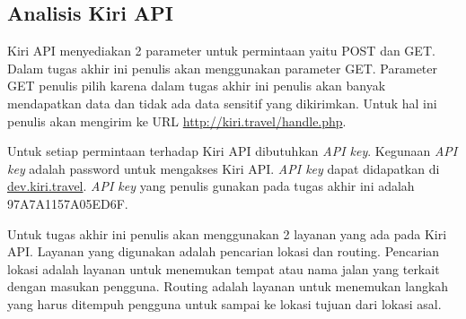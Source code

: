 \subsection{Analisis Kiri API}
\label{lab:Analisis Kiri API}
\hspace{0.5cm} Kiri API menyediakan 2 parameter untuk permintaan yaitu POST dan GET. Dalam tugas akhir ini penulis akan menggunakan parameter GET. Parameter GET penulis pilih karena dalam tugas akhir ini penulis akan banyak mendapatkan data dan tidak ada data sensitif yang dikirimkan. Untuk hal ini penulis akan mengirim ke URL \url{http://kiri.travel/handle.php}.

\hspace{0.5cm} Untuk setiap permintaan terhadap Kiri API dibutuhkan \textit{API key}. Kegunaan \textit{API key} adalah password untuk mengakses Kiri API. \textit{API key} dapat didapatkan di \url{dev.kiri.travel}. \textit{API key} yang penulis gunakan pada tugas akhir ini adalah 97A7A1157A05ED6F.
     
\hspace{0.5cm} Untuk tugas akhir ini penulis akan menggunakan 2 layanan yang ada pada Kiri API. Layanan yang digunakan adalah pencarian lokasi dan routing. Pencarian lokasi adalah layanan untuk menemukan tempat atau nama jalan yang terkait dengan masukan pengguna. Routing adalah layanan untuk menemukan langkah yang harus ditempuh pengguna untuk sampai ke lokasi tujuan dari lokasi asal. 

